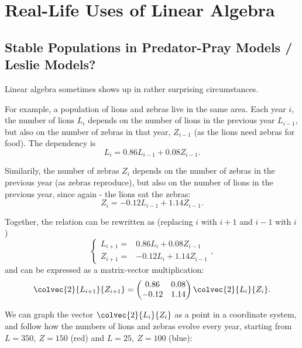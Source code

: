 \chapter{Real-Life Uses of Linear Algebra}
\section{Stable Populations in Predator-Pray Models / Leslie Models?}
Linear algebra sometimes shows up in rather surprising circumstances.

For example, a population of lions and zebras live in the same area. Each year $i$, the number of lions $L_{i}$ depends on the number of lions in the previous year $L_{i-1}$, but also on the number of zebras in that year, $Z_{i-1}$ (as the lions need zebras for food). The dependency is
\begin{equation*}
  L_{i} = 0.86L_{i-1} + 0.08Z_{i-1}.
\end{equation*}

Similarily, the number of zebras $Z_{i}$ depends on the number of zebras in the previous year (as zebras reproduce), but also on the number of lions in the previous year, since again - the lions eat the zebras:
\begin{equation*}
  Z_{i} = -0.12L_{i-1} + 1.14Z_{i-1}.
\end{equation*}

Together, the relation can be rewritten as (replacing $i$ with $i+1$ and $i-1$ with $i$)
\begin{equation*}
  \begin{cases}
    L_{i+1} = & 0.86L_{i} + 0.08Z_{i-1}\\
    Z_{i+1} = & -0.12L_{i} + 1.14Z_{i-1}
  \end{cases},
\end{equation*}
and can be expressed as a matrix-vector multiplication:
\begin{equation*}
  \colvec{2}{L_{i+1}}{Z_{i+1}} = \begin{pmatrix} 0.86 & 0.08 \\ -0.12 & 1.14 \end{pmatrix}\colvec{2}{L_{i}}{Z_{i}}.
\end{equation*}

We can graph the vector $\colvec{2}{L_{i}}{Z_{i}}$ as a point in a coordinate system, and follow how the numbers of lions and zebras evolve every year, starting from $L=350,\ Z=150$ (red) and $L=25,\ Z=100$ (blue):

